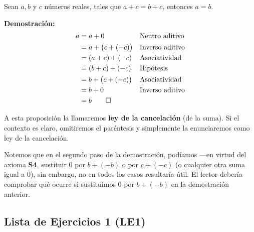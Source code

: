 \documentclass[11pt]{article}
\begin{document}
\pagebreak

Sean $a,b$ y $c$ números reales, tales que $a+c=b+c$, entonces $a=b$.

\textbf{Demostración:} \begin{align*}
    a &= a+0 && \text{Neutro aditivo}\\
    &= a+ \bigl(c+(-c)\bigr) && \text{Inverso aditivo}\\
    &= (a+c) + (-c) && \text{Asociatividad}\\
    &= (b+c) + (-c) && \text{Hipótesis}\\
    &= b + \bigl(c+(-c)\bigr) && \text{Asociatividad}\\
    &= b + 0 && \text{Inverso aditivo}\\
    &= b \qedhere
\end{align*}

A esta proposición la llamaremos \textbf{ley de la cancelación} (de la suma). Si el contexto es claro, omitiremos el paréntesis y simplemente la enunciaremos como ley de la cancelación.

Notemos que en el segundo paso de la demostración, podíamos —en virtud del axioma \textbf{S4}, sustituir $0$ por $b+(-b)$ o por $c+(-c)$ (o cualquier otra suma igual a $0$), sin embargo, no en todos los casos resultaría útil. El lector debería comprobar qué ocurre si sustituimos $0$ por $b+(-b)$ en la demostración anterior.

\subsection*{Lista de Ejercicios 1 (LE1)}
\end{document}
